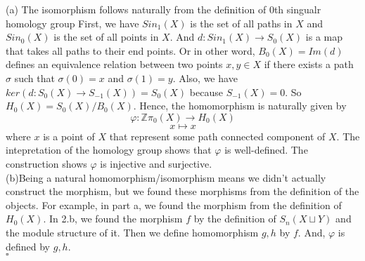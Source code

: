 \documentclass[12pt]{amsart}
\newcommand{\Z}{\mathbb{Z}}
\begin{document}
(a) The isomorphism follows naturally from the definition of 0th singualr homology group First, we have $Sin_1(X)$ is the set of all paths in $X$ and $Sin_0(X)$ is the set of all points in $X$. And $d:Sin_1(X)\to S_0(X)$ is a map that takes all paths to their end points. Or in other word, $B_0(X)=Im(d)$ defines an equivalence relation between two points $x,y\in X$ if there exists a path $\sigma$ such that $\sigma(0)=x$ and $\sigma(1)=y$. Also, we have $ker(d:S_0(X)\to S_{-1}(X))=S_0(X)$ because $S_{-1}(X)=0$. So $H_0(X)=S_0(X)/B_0(X)$. Hence, the homomorphism is naturally given by 
\[\varphi:\Z\pi_0(X)\to H_0(X)\]
\[x\mapsto x\]
where $x$ is a point of $X$ that represent some path connected component of $X$. The intepretation of the homology group shows that $\varphi$ is well-defined. The construction shows $\varphi$ is injective and surjective.\\
(b)Being a natural homomorphism/isomorphism means we didn't actually construct the morphism, but we found these morphisms from the definition of the objects. For example, in part a, we found the morphism from the definition of $H_0(X)$. In 2.b, we found the morphism $f$ by the definition of $S_n(X\sqcup Y)$ and the module structure of it. Then we define homomorphism $g,h$ by $f$. And, $\varphi$ is defined by $g,h$.
\\\phantom{qed}\hfill$\square$
\end{document}
